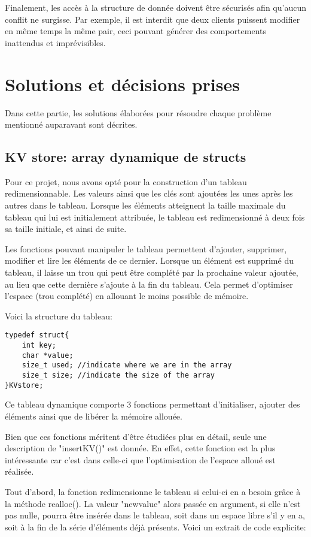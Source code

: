 \documentclass[11pt,a4paper]{article}
\begin{document}
Finalement, les accès à la structure de donnée doivent être sécurisés afin qu'aucun conflit ne surgisse. Par exemple, il est interdit que deux clients puissent modifier en même temps la même pair, ceci pouvant générer des comportements inattendus et imprévisibles.

\section{Solutions et décisions prises}
Dans cette partie, les solutions élaborées pour résoudre chaque problème mentionné auparavant sont décrites.

\subsection{KV store: array dynamique de structs}
Pour ce projet, nous avons opté pour la construction d'un tableau redimensionnable. Les valeurs ainsi que les clés sont ajoutées les unes après les autres dans le tableau. Lorsque les éléments atteignent la taille maximale du tableau qui lui est initialement attribuée, le tableau est redimensionné à deux fois sa taille initiale, et ainsi de suite.

Les fonctions pouvant manipuler le tableau permettent d'ajouter, supprimer, modifier et  lire les éléments de ce dernier. Lorsque un élément est supprimé du tableau, il laisse un trou qui peut être complété par la prochaine valeur ajoutée, au lieu que cette dernière s'ajoute à la fin du tableau. Cela permet d'optimiser l'espace (trou complété) en allouant le moins possible de mémoire.

Voici la structure du tableau:

\begin{lstlisting}
typedef struct{
    int key; 
    char *value;
    size_t used; //indicate where we are in the array
    size_t size; //indicate the size of the array
}KVstore;
\end{lstlisting}

Ce tableau dynamique comporte 3 fonctions permettant d'initialiser, ajouter des éléments ainsi que de libérer la mémoire allouée. 

Bien que ces fonctions méritent d'être étudiées plus en détail, seule une description de "insertKV()" est donnée. En effet, cette fonction est la plus intéressante car c'est dans celle-ci que l'optimisation de l'espace alloué est réalisée.

Tout d'abord, la fonction redimensionne le tableau si celui-ci en a besoin  grâce à la méthode realloc(). La valeur "newvalue" alors passée en argument, si elle n'est pas nulle,  pourra être insérée dans le tableau, soit dans un espace libre s'il y en a, soit à la fin de la série d'éléments déjà présents. Voici un extrait de code explicite:
\end{document}

